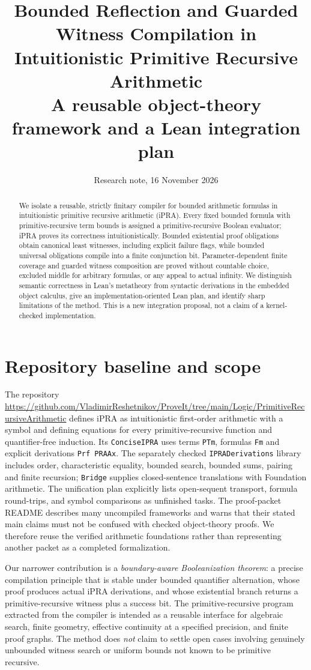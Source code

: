 \documentclass[11pt]{article}
\title{Bounded Reflection and Guarded Witness Compilation in Intuitionistic Primitive Recursive Arithmetic\\\large A reusable object-theory framework and a Lean integration plan}
\author{Research note, 16 November 2026}
\date{}
\begin{document}
\maketitle
\begin{abstract}
We isolate a reusable, strictly finitary compiler for bounded arithmetic formulas in intuitionistic primitive recursive arithmetic (iPRA). Every fixed bounded formula with primitive-recursive term bounds is assigned a primitive-recursive Boolean evaluator; iPRA proves its correctness intuitionistically. Bounded existential proof obligations obtain canonical least witnesses, including explicit failure flags, while bounded universal obligations compile into a finite conjunction bit. Parameter-dependent finite coverage and guarded witness composition are proved without countable choice, excluded middle for arbitrary formulas, or any appeal to actual infinity. We distinguish semantic correctness in Lean's metatheory from syntactic derivations in the embedded object calculus, give an implementation-oriented Lean plan, and identify sharp limitations of the method. This is a new integration proposal, not a claim of a kernel-checked implementation.
\end{abstract}
\tableofcontents
\section{Repository baseline and scope}
The repository \url{https://github.com/VladimirReshetnikov/ProveIt/tree/main/Logic/PrimitiveRecursiveArithmetic} defines iPRA as intuitionistic first-order arithmetic with a symbol and defining equations for every primitive-recursive function and quantifier-free induction. Its \texttt{ConciseIPRA} uses terms \texttt{PTm}, formulas \texttt{Fm} and explicit derivations \texttt{Prf PRAAx}. The separately checked \texttt{IPRADerivations} library includes order, characteristic equality, bounded search, bounded sums, pairing and finite recursion; \texttt{Bridge} supplies closed-sentence translations with Foundation arithmetic. The unification plan explicitly lists open-sequent transport, formula round-trips, and symbol comparisons as unfinished tasks. The proof-packet README describes many uncompiled frameworks and warns that their stated main claims must not be confused with checked object-theory proofs. We therefore reuse the verified arithmetic foundations rather than representing another packet as a completed formalization.

Our narrower contribution is a \emph{boundary-aware Booleanization theorem}: a precise compilation principle that is stable under bounded quantifier alternation, whose proof produces actual iPRA derivations, and whose existential branch returns a primitive-recursive witness plus a success bit. The primitive-recursive program extracted from the compiler is intended as a reusable interface for algebraic search, finite geometry, effective continuity at a specified precision, and finite proof graphs. The method does \emph{not} claim to settle open cases involving genuinely unbounded witness search or uniform bounds not known to be primitive recursive.
\end{document}
